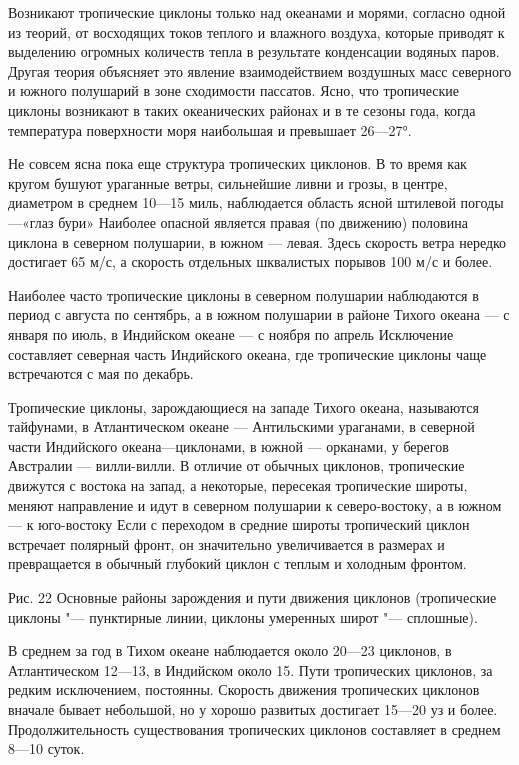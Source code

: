 Возникают тропические циклоны только над океанами и морями, согласно одной из теорий, от восходящих токов теплого и влажного воздуха, которые приводят к выделению огромных количеств тепла в результате конденсации водяных паров. Другая теория объясняет это явление взаимодействием воздушных масс северного и южного полушарий в зоне сходимости пассатов. Ясно, что тропические циклоны возникают в таких океанических районах и в те сезоны года, когда температура поверхности моря наибольшая и превышает 26—27°.

Не совсем ясна пока еще структура тропических циклонов. В то время как кругом бушуют ураганные ветры, сильнейшие ливни и грозы, в центре, диаметром в среднем 10—15 миль, наблюдается область ясной штилевой погоды—«глаз бури» Наиболее опасной является правая (по движению) половина циклона в северном полушарии, в южном — левая. Здесь скорость ветра нередко достигает 65 м/с, а скорость отдельных шквалистых порывов 100 м/с и более.

Наиболее часто тропические циклоны в северном полушарии наблюдаются в период с августа по сентябрь, а в южном полушарии в районе Тихого океана — с января по июль, в Индийском океане — с ноября по апрель Исключение составляет северная часть Индийского океана, где тропические циклоны чаще встречаются с мая по декабрь.

Тропические циклоны, зарождающиеся на западе Тихого океана, называются тайфунами, в Атлантическом океане — Антильскими ураганами, в северной части Индийского океана—циклонами, в южной — орканами, у берегов Австралии — вилли-вилли. В отличие от обычных циклонов, тропические движутся с востока на запад, а некоторые, пересекая тропические широты, меняют направление и идут в северном полушарии к северо-востоку, а в южном — к юго-востоку Если с переходом в средние широты тропический циклон встречает полярный фронт, он значительно увеличивается в размерах и превращается в обычный глубокий циклон с теплым и холодным фронтом.


Рис. 22 Основные районы зарождения и пути движения циклонов
(тропические циклоны "--- пунктирные линии, циклоны умеренных широт "--- сплошные).

В среднем за год в Тихом океане наблюдается около 20—23 циклонов, в Атлантическом 12—13, в Индийском около 15. Пути тропических циклонов, за редким исключением, постоянны. Скорость движения тропических циклонов вначале бывает небольшой, но у хорошо развитых достигает 15—20 уз и более. Продолжительность существования тропических циклонов составляет в среднем 8—10 суток.

